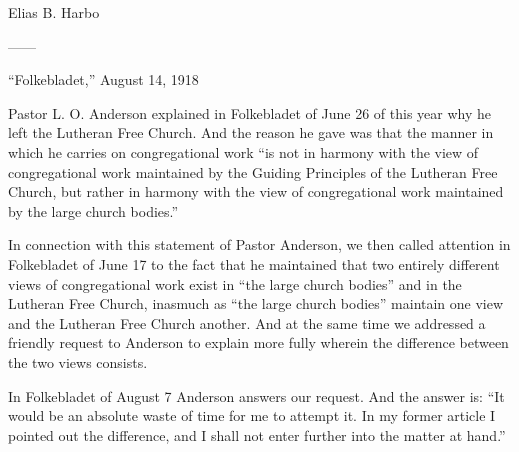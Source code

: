 
%
%
%
%
%
%



Elias B. Harbo

——

“Folkebladet,” August 14, 1918

Pastor L. O. Anderson explained in Folkebladet of June 26 of this year why he left the Lutheran Free Church. And the reason he gave was that the manner in which he carries on congregational work “is not in harmony with the view of congregational work maintained by the Guiding Principles of the Lutheran Free Church, but rather in harmony with the view of congregational work maintained by the large church bodies.”

In connection with this statement of Pastor Anderson, we then called attention in Folkebladet of June 17 to the fact that he maintained that two entirely different views of congregational work exist in “the large church bodies” and in the Lutheran Free Church, inasmuch as “the large church bodies” maintain one view and the Lutheran Free Church another. And at the same time we addressed a friendly request to Anderson to explain more fully wherein the difference between the two views consists.

In Folkebladet of August 7 Anderson answers our request. And the answer is: “It would be an absolute waste of time for me to attempt it. In my former article I pointed out the difference, and I shall not enter further into the matter at hand.”

